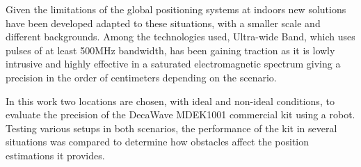 Given the limitations of the global positioning systems at indoors new solutions have been developed adapted to these situations, with a smaller scale and different backgrounds.
Among the technologies used, Ultra-wide Band, which uses pulses of at least 500MHz bandwidth, has been gaining traction as it is lowly intrusive and highly effective in a saturated electromagnetic spectrum giving a precision in the order of centimeters depending on the scenario.

In this work two locations are chosen, with ideal and non-ideal conditions, to evaluate the precision of the DecaWave MDEK1001 commercial kit using a robot.
Testing various setups in both scenarios, the performance of the kit in several situations was compared to determine how obstacles affect the position estimations it provides.